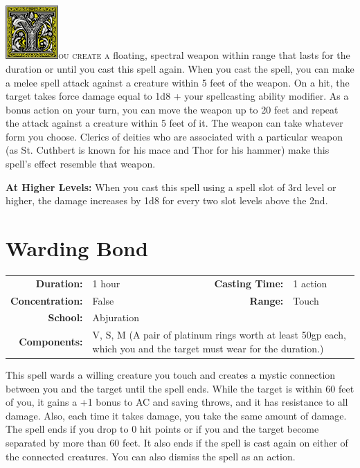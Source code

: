 \documentclass[12pt,showtrims]{memoir}
\begin{document}
\vspace{1\baselineskip}\noindent 
\lettrine[lines=4]{\includegraphics[height=58pt]{initials/Y.png}}{ou create a} floating, spectral weapon within range that lasts for the duration or until you cast this spell again. When you cast the spell, you can make a melee spell attack against a creature within 5 feet of the weapon. On a hit, the target takes force damage equal to 1d8 + your spellcasting ability modifier. As a bonus action on your turn, you can move the weapon up to 20 feet and repeat the attack against a creature within 5 feet of it. The weapon can take whatever form you choose. Clerics of deities who are associated with a particular weapon (as St. Cuthbert is known for his mace and Thor for his hammer) make this spell's effect resemble that weapon.

\vspace{8pt} \noindent\textbf{At Higher Levels:} When you cast this spell using a spell slot of 3rd level or higher, the damage increases by 1d8 for every two slot levels above the 2nd.
\newpage
\section*{Warding Bond}

{
\small\centering\vspace{-6pt}
\begin{tabular}{rlrl}
\toprule

\textbf{Duration:} & 1 hour &
\textbf{Casting Time:} & 1 action \\
\textbf{Concentration:} & False &
\textbf{Range:} & Touch \\
\textbf{School:} & Abjuration \\
\textbf{Components:} & \multicolumn{3}{p{0.7\textwidth}}{V, S, M (A pair of platinum rings worth at least 50gp each, which you and the target must wear for the duration.)}\\

\bottomrule
\end{tabular}
}

\vspace{1\baselineskip}\noindent This spell wards a willing creature you touch and creates a mystic connection between you and the target until the spell ends. While the target is within 60 feet of you, it gains a +1 bonus to AC and saving throws, and it has resistance to all damage. Also, each time it takes damage, you take the same amount of damage. The spell ends if you drop to 0 hit points or if you and the target become separated by more than 60 feet. It also ends if the spell is cast again on either of the connected creatures. You can also dismiss the spell as an action.
\end{document}

